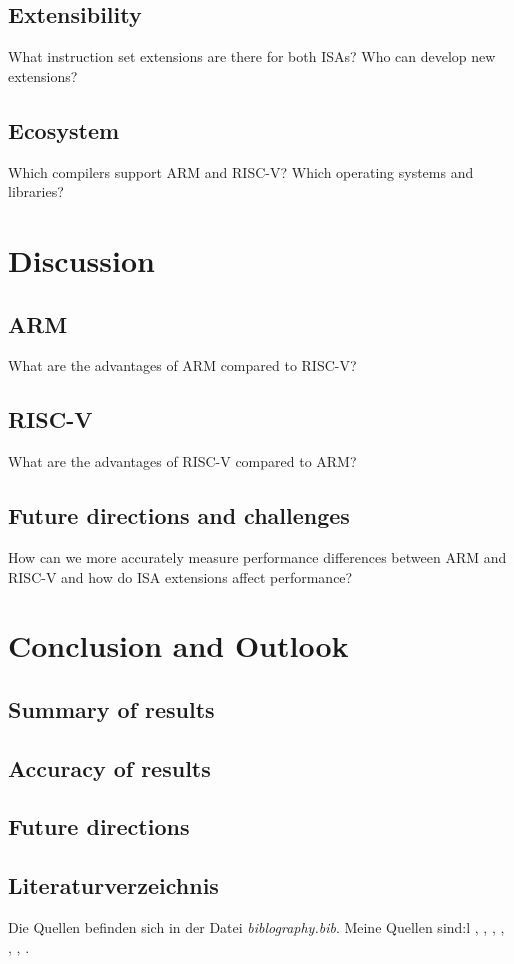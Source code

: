 \documentclass[conference]{IEEEtran}
\begin{document}
	\subsection{Extensibility}
	What instruction set extensions are there for both ISAs? Who can develop new extensions?
	\subsection{Ecosystem}
	Which compilers support ARM and RISC-V? Which operating systems and libraries?


\section{Discussion}
\label{ref:discussion}
	\subsection{ARM}
	What are the advantages of ARM compared to RISC-V?
	\subsection{RISC-V}
	What are the advantages of RISC-V compared to ARM?
	\subsection{Future directions and challenges}
	How can we more accurately measure performance differences between ARM and RISC-V and how do ISA extensions affect performance?

\section{Conclusion and Outlook}
\label{ref:conclusion}
	\subsection{Summary of results}
	\subsection{Accuracy of results}
	\subsection{Future directions}

\subsection{Literaturverzeichnis}
Die Quellen befinden sich in der Datei \textit{biblography.bib}. 
Meine Quellen sind:l \cite{50years}, \cite{ArmManual}, \cite{hennessy2012computer}, \cite{WisconsinMadison2016} \cite{drechsler2020enhanced}, \cite{Asanovic2016}, \cite{IEEE2018} \cite{Dirvin2019}, \cite{Bandic2019}.



\end{document}
